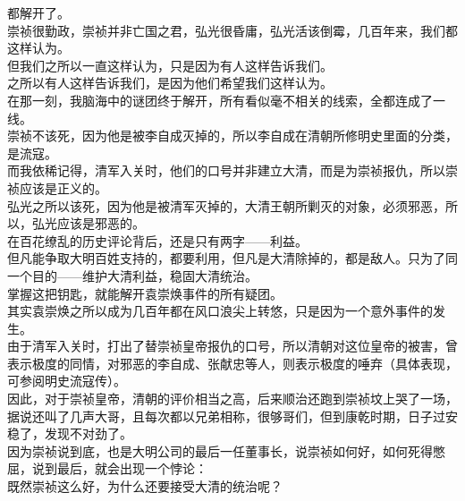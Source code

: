 \begin{multicols}{\theparacolNo}
都解开了。\\

崇祯很勤政，崇祯并非亡国之君，弘光很昏庸，弘光活该倒霉，几百年来，我们都这样认为。\\

但我们之所以一直这样认为，只是因为有人这样告诉我们。\\

之所以有人这样告诉我们，是因为他们希望我们这样认为。\\

在那一刻，我脑海中的谜团终于解开，所有看似毫不相关的线索，全都连成了一线。\\

崇祯不该死，因为他是被李自成灭掉的，所以李自成在清朝所修明史里面的分类，是流寇。\\

而我依稀记得，清军入关时，他们的口号并非建立大清，而是为崇祯报仇，所以崇祯应该是正义的。\\

弘光之所以该死，因为他是被清军灭掉的，大清王朝所剿灭的对象，必须邪恶，所以，弘光应该是邪恶的。\\

在百花缭乱的历史评论背后，还是只有两字——利益。\\

但凡能争取大明百姓支持的，都要利用，但凡是大清除掉的，都是敌人。只为了同一个目的——维护大清利益，稳固大清统治。\\

掌握这把钥匙，就能解开袁崇焕事件的所有疑团。\\

其实袁崇焕之所以成为几百年都在风口浪尖上转悠，只是因为一个意外事件的发生。\\

由于清军入关时，打出了替崇祯皇帝报仇的口号，所以清朝对这位皇帝的被害，曾表示极度的同情，对邪恶的李自成、张献忠等人，则表示极度的唾弃（具体表现，可参阅明史流寇传）。\\

因此，对于崇祯皇帝，清朝的评价相当之高，后来顺治还跑到崇祯坟上哭了一场，据说还叫了几声大哥，且每次都以兄弟相称，很够哥们，但到康乾时期，日子过安稳了，发现不对劲了。\\

因为崇祯说到底，也是大明公司的最后一任董事长，说崇祯如何好，如何死得憋屈，说到最后，就会出现一个悖论：\\

既然崇祯这么好，为什么还要接受大清的统治呢？\\


\end{multicols}
